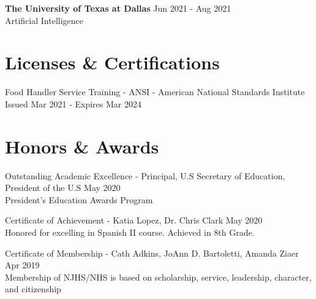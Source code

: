 \documentclass[a4paper, 10pt]{article}
\begin{document}
\textbf{The University of Texas at Dallas} \hfill Jun 2021 - Aug 2021 \\
Artificial Intelligence

\section*{Licenses \& Certifications}
Food Handler Service Training - ANSI - American National Standards Institute \hfill Issued Mar 2021 - Expires Mar 2024

\section*{Honors \& Awards}
Outstanding Academic Excellence - Principal, U.S Secretary of Education, President of the U.S \hfill May 2020 \\
President's Education Awards Program

Certificate of Achievement - Katia Lopez, Dr. Chris Clark \hfill May 2020 \\
Honored for excelling in Spanish II course. Achieved in 8th Grade.

Certificate of Membership - Cath Adkins, JoAnn D. Bartoletti, Amanda Ziaer \hfill Apr 2019 \\
Membership of NJHS/NHS is based on scholarship, service, leadership, character, and citizenship
\end{document}
